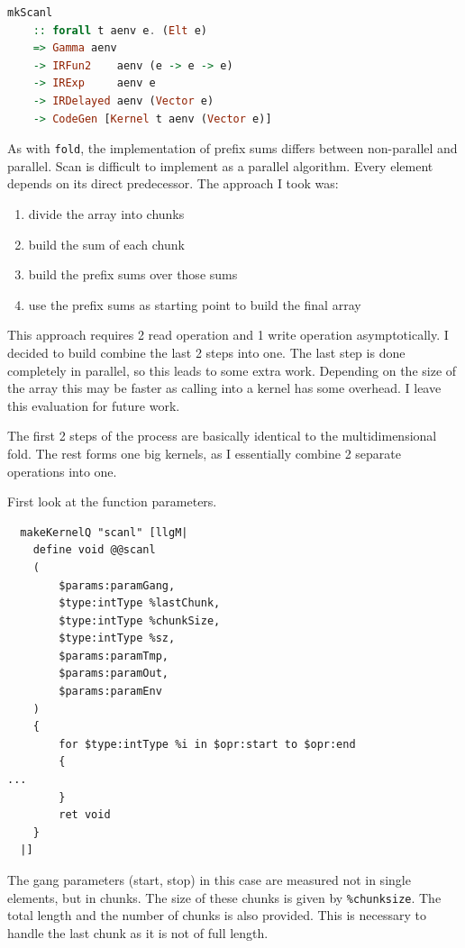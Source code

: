 \documentclass[a4paper,bibliography=totocnumbered,parskip,headsepline]{scrbook}
\begin{document}
\begin{lstlisting}[language=haskell]
mkScanl
    :: forall t aenv e. (Elt e)
    => Gamma aenv
    -> IRFun2    aenv (e -> e -> e)
    -> IRExp     aenv e
    -> IRDelayed aenv (Vector e)
    -> CodeGen [Kernel t aenv (Vector e)]
\end{lstlisting}

As with \lstinline[language=haskell]!fold!, the implementation of prefix sums differs between non-parallel and parallel.
Scan is difficult to implement as a parallel algorithm.
Every element depends on its direct predecessor.
The approach I took was:

\begin{enumerate}
\item divide the array into chunks
\item build the sum of each chunk
\item build the prefix sums over those sums
\item use the prefix sums as starting point to build the final array
\end{enumerate}

This approach requires 2 read operation and 1 write operation asymptotically.
I decided to build combine the last 2 steps into one.
The last step is done completely in parallel, so this leads to some extra work.
Depending on the size of the array this may be faster as calling into a kernel has some overhead.
I leave this evaluation for future work.

The first 2 steps of the process are basically identical to the multidimensional fold.
The rest forms one big kernels, as I essentially combine 2 separate operations into one.

First look at the function parameters.
\begin{lstlisting}
  makeKernelQ "scanl" [llgM|
    define void @@scanl
    (
        $params:paramGang,
        $type:intType %lastChunk,
        $type:intType %chunkSize,
        $type:intType %sz,
        $params:paramTmp,
        $params:paramOut,
        $params:paramEnv
    )
    {
        for $type:intType %i in $opr:start to $opr:end
        {
...
        }
        ret void
    }
  |]
\end{lstlisting}
The gang parameters (start, stop) in this case are measured not in single elements, but in chunks.
The size of these chunks is given by \lstinline{%chunksize}.
The total length and the number of chunks is also provided.
This is necessary to handle the last chunk as it is not of full length.
\end{document}
